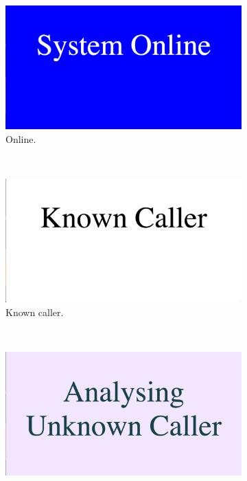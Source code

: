 \documentclass[main.tex]{subfiles}
\begin{document}
\begin{figure}[H]
	\captionsetup[subfigure]{position=b}
        \centering
        \begin{subfigure}{0.45\textwidth}
                \includegraphics[width=\textwidth]{pics/state1}
                \caption{Online.}
                \label{fig:state1}
        \end{subfigure}
        ~
        \begin{subfigure}{0.45\textwidth}
                \includegraphics[width=\textwidth]{pics/state2}
                \caption{Known caller.}
                \label{fig:state2}
        \end{subfigure}
		\\
		\begin{subfigure}{0.45\textwidth}
				\includegraphics[width=\textwidth]{pics/state4}

\end{subfigure}
\end{figure}
\end{document}
